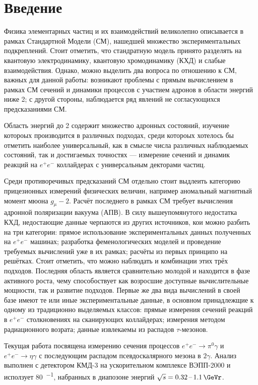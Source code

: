 \section{Введение}


Физика элементарных частиц и их взаимодействий великолепно описывается в рамках Стандартной Модели (СМ),
нашедшей множество экспериментальных подкреплений.
Стоит отметить,
что стандратную модель принято разделять на квантовую электродинамику,
квантовую хромодинамику (КХД)
и слабые взаимодействия.
Однако,
можно выделить два вопроса по отношению к СМ,
важных для данной работы:
возникают проблемы с прямым вычислением в рамках СМ сечений и динамики процессов с участием адронов в области энергий ниже \SI{2}{\GeVr};
с другой стороны,
наблюдается ряд явлений не согласующихся предсказаниями СМ.

Область энергий до \SI{2}{\GeVr} содержит множество адронных состояний,
изучение котороых производится в различных подходах,
среди котороых хотелось бы отметить наиболее универсальный, 
как в смысле числа различных наблюдаемых состояний,
так и достигаемых точностях
---
измерение сечений и динамик реакций на $e^+ e^-$ коллайдерах с универсальным декторами частиц.

Среди противоречивых предсказаний СМ
отдельно стоит выдлеить категорию прицезионных измерений физических величин,
например аномальный магнитный момент мюона $g_\mu - 2$.
Расчёт последнего в рамках СМ требует вычисления адронной поляризации вакуума (АПВ).
В силу вышеупомянутого недостатка КХД,
недостающие данные черпаются из других источников,
кои можно разбить на три категории:
прямое использование экспериментальных данных полученных на $e^+ e^-$ машинах;
разработка феменологических моделей и проведение требуемых вычислений уже в их рамках;
расчёты из первых принципо на решётках.
Стоит отметить,
что можно наблюдать и комбинации этих трёх подходов.
Последняя область является сравнительно молодой и находится в фазе активного роста,
чему способоствует как возросшие доступные вычислительные мощности,
так и развитие подходов.
Первые же два вида вычислений в своей базе имеют те или иные экспериментальные данные,
в основном принадлежщие к одному из традиционно выделяемых классов:
прямые измерения сечений реакций в $e^+ e^-$ столкновениях на сканирующих коллайдерах;
измерения методом радиационного возрата;
данные извлекаемы из распадов $\tau$-мезонов.


Текущая работа посвящена измерению сечения процессов
$e^+e^- \to \pi^0 \gamma$ и 
$e^+e^- \to \eta \gamma$ с последующим распадом псевдоскалярного мезона в $2\gamma$.
Анализ выполнен с детектором КМД-3 на ускорительном комплексе ВЭПП-2000
и исползует \SI{80}{\pbarnr^{-1}},
набранных в диапозоне энергий $\sqrt{s} = \SIrange{0.32}{1.1}{\GeVr}$.



